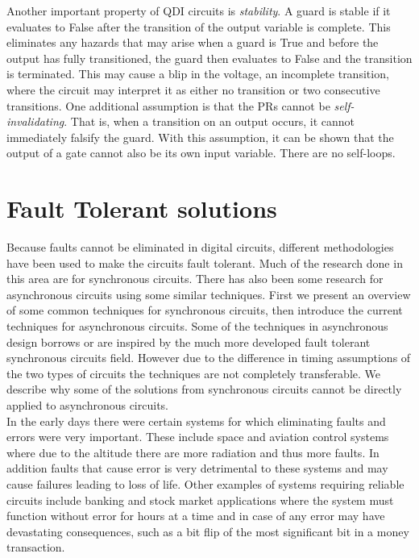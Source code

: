 \documentclass[12pt]{report}
\begin{document}
Another important property of QDI circuits is \textit{stability}.  A guard is stable if it evaluates to False after the transition of the output variable is complete.  This eliminates any hazards that may arise when a guard is True and before the output has fully transitioned, the guard then evaluates to False and the transition is terminated.  This may cause a blip in the voltage, an incomplete transition, where the circuit may interpret it as either no transition or two consecutive transitions.  One additional assumption is that the PRs cannot be \textit{self-invalidating}.  That is, when a transition on an output occurs, it cannot immediately falsify the guard.  With this assumption, it can be shown that the output of a gate cannot also be its own input variable.  There are no self-loops.  

\section{Fault Tolerant solutions}

Because faults cannot be eliminated in digital circuits, different methodologies have been used to make the circuits fault tolerant.  Much of the research done in this area are for synchronous circuits.  There has also been some research for asynchronous circuits using some similar techniques. First we present an overview of some common techniques for synchronous circuits, then introduce the current techniques for asynchronous circuits.  Some of the techniques in asynchronous design borrows or are inspired by the much more developed fault tolerant synchronous circuits field.  However due to the difference in timing assumptions of the two types of circuits the techniques are not completely transferable.  We describe why some of the solutions from synchronous circuits cannot be directly applied to asynchronous circuits.\\

In the early days there were certain systems for which eliminating faults and errors were very important.  These include space and aviation control systems where due to the altitude there are more radiation and thus more faults.  In addition faults that cause error is very detrimental to these systems and may cause failures leading to loss of life.  Other examples of systems requiring reliable circuits include banking and stock market applications where the system must function without error for hours at a time and in case of any error may have devastating consequences, such as a bit flip of the most significant bit in a money transaction. \\
\end{document}
